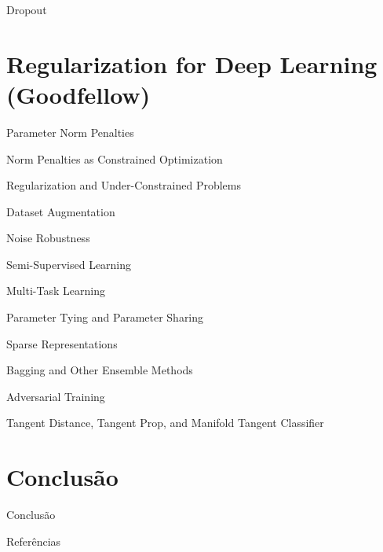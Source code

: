 \documentclass{beamer}
\begin{document}
\begin{frame}{Dropout}
\end{frame}

\section{Regularization for Deep Learning (Goodfellow)}

\begin{frame}{Parameter Norm Penalties}
\end{frame}

\begin{frame}{Norm Penalties as Constrained Optimization}
\end{frame}

\begin{frame}{Regularization and Under-Constrained Problems}
\end{frame}

\begin{frame}{Dataset Augmentation}
\end{frame}

\begin{frame}{Noise Robustness}
\end{frame}

\begin{frame}{Semi-Supervised Learning}
\end{frame}

\begin{frame}{Multi-Task Learning}
\end{frame}

\begin{frame}{Parameter Tying and Parameter Sharing}
\end{frame}

\begin{frame}{Sparse Representations}
\end{frame}

\begin{frame}{Bagging and Other Ensemble Methods}
\end{frame}

\begin{frame}{Adversarial Training}
\end{frame}

\begin{frame}{Tangent Distance, Tangent Prop, and Manifold Tangent Classifier}
\end{frame}

\section{Conclusão}

\begin{frame}{Conclusão}
\end{frame}

\begin{frame}{Referências}
\end{frame}
\end{document}
